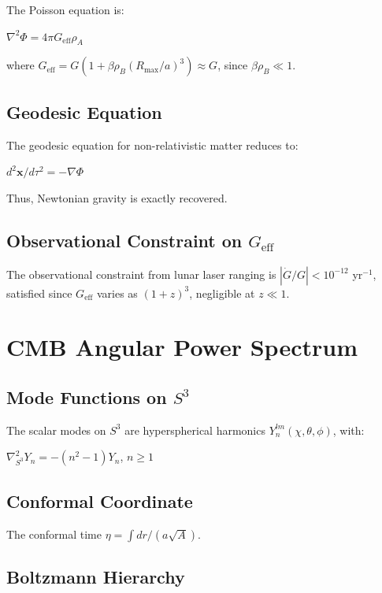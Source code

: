 \documentclass[10pt,twocolumn]{article}
\theoremstyle{definition}
\newcommand{\Rmax}{R_{\max}}
\newcommand{\rhoA}{\rho_{A}}
\newcommand{\rhoB}{\rho_{B}}
\begin{document}
The Poisson equation is:

\( \nabla^{2} \Phi = 4 \pi G_{\mathrm{eff}} \rhoA \)

where \( G_{\mathrm{eff}} = G (1 + \beta \rhoB (\Rmax / a)^{3}) \approx G \), since \( \beta \rhoB \ll 1 \).

\subsection{Geodesic Equation}

The geodesic equation for non-relativistic matter reduces to:

\( d^{2} \mathbf{x} / d\tau^{2} = - \nabla \Phi \)

Thus, Newtonian gravity is exactly recovered.

\subsection{Observational Constraint on \( G_{\mathrm{eff}} \)}

The observational constraint from lunar laser ranging \citep{Hofmann2018} is \( |\dot{G} / G| < 10^{-12} \) yr\( ^{-1} \), satisfied since \( G_{\mathrm{eff}} \) varies as \( (1 + z)^{3} \), negligible at \( z \ll 1 \).

\section{CMB Angular Power Spectrum}
\label{sec:cmb}

\subsection{Mode Functions on \( S^{3} \)}

The scalar modes on \( S^{3} \) are hyperspherical harmonics \( Y_{n}^{lm} (\chi, \theta, \phi) \), with:

\( \nabla^{2}_{S^{3}} Y_{n} = - (n^{2} - 1) Y_{n} \), \( n \geq 1 \)

\subsection{Conformal Coordinate}

The conformal time \( \eta = \int dr / (a \sqrt{A}) \).

\subsection{Boltzmann Hierarchy}
\end{document}
